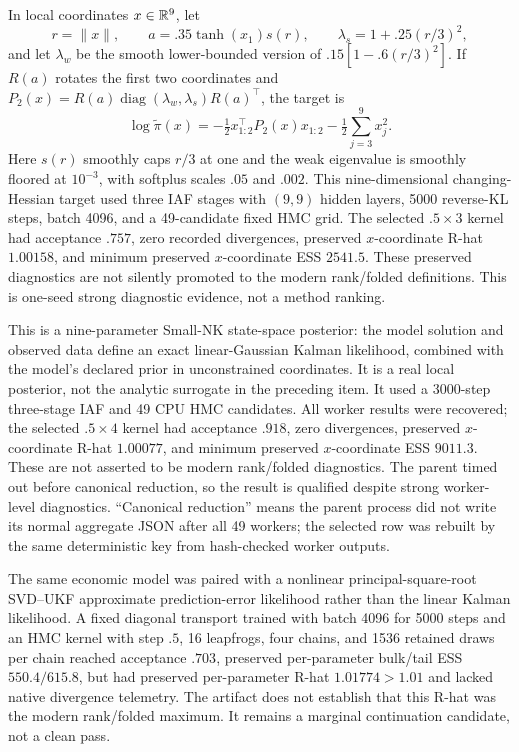\begin{description}[style=nextline]
 \item[NK-like analytic surrogate.] In local coordinates $x\in\mathbb{R}^9$, let
\begin{equation}
 r=\|x\|,\qquad a=.35\tanh(x_1)s(r),\qquad
 \lambda_s=1+.25(r/3)^2,
\end{equation}
and let $\lambda_w$ be the smooth lower-bounded version of
$.15[1-.6(r/3)^2]$.  If $R(a)$ rotates the first two coordinates and
 $P_2(x)=R(a)\operatorname{diag}(\lambda_w,\lambda_s)R(a)^\top$, the target is
 \begin{equation}
  \log\widetilde\pi(x)=-\tfrac12x_{1:2}^\top P_2(x)x_{1:2}
  -\tfrac12\sum_{j=3}^9x_j^2.
 \end{equation}
 Here $s(r)$ smoothly caps $r/3$ at one and the weak eigenvalue is smoothly
 floored at $10^{-3}$, with softplus scales $.05$ and $.002$.  This
 nine-dimensional changing-Hessian target used three IAF stages with $(9,9)$ hidden
 layers, 5000 reverse-KL steps, batch 4096, and a 49-candidate fixed HMC grid.
 The selected $.5\times3$ kernel had acceptance $.757$, zero recorded
 divergences, preserved $x$-coordinate R-hat $1.00158$, and minimum preserved
 $x$-coordinate ESS $2541.5$.  These preserved diagnostics are not silently
 promoted to the modern rank/folded definitions.  This is one-seed
 strong diagnostic evidence, not a method ranking.

 \item[Small/real NK local posterior.] This is a nine-parameter Small-NK
 state-space posterior: the model solution and observed data define an exact
 linear-Gaussian Kalman likelihood, combined with the model's declared prior
 in unconstrained coordinates.  It is a real local posterior, not the analytic
 surrogate in the preceding item.  It used a
 3000-step three-stage IAF and 49 CPU HMC candidates.  All worker results were
 recovered; the selected $.5\times4$ kernel had acceptance $.918$, zero
 divergences, preserved $x$-coordinate R-hat $1.00077$, and minimum preserved
 $x$-coordinate ESS $9011.3$.  These are not asserted to be modern rank/folded
 diagnostics.  The parent timed out before
 canonical reduction, so the result is qualified despite strong worker-level
 diagnostics.  ``Canonical reduction'' means the parent process did not write
 its normal aggregate JSON after all 49 workers; the selected row was rebuilt
 by the same deterministic key from hash-checked worker outputs.

 \item[Small/real NK principal-square-root SVD--UKF.] The same economic model
 was paired with a nonlinear principal-square-root SVD--UKF approximate
 prediction-error likelihood rather than the linear Kalman likelihood.  A
 fixed diagonal transport trained with batch 4096 for 5000 steps and an HMC
 kernel with step $.5$, 16 leapfrogs, four chains, and 1536 retained draws per
 chain reached acceptance $.703$, preserved per-parameter bulk/tail ESS
 $550.4/615.8$, but had preserved per-parameter R-hat $1.01774>1.01$ and lacked
 native divergence telemetry.  The artifact does not establish that this
 R-hat was the modern rank/folded maximum.  It remains a marginal
 continuation candidate, not a clean pass.


\end{description}
